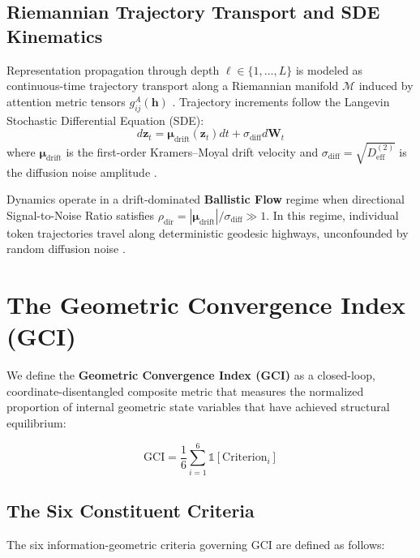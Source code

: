 \documentclass[11pt,twocolumn]{article}
\begin{document}
\subsection{Riemannian Trajectory Transport and SDE Kinematics}
Representation propagation through depth $\ell \in \{1, \dots, L\}$ is modeled as continuous-time trajectory transport along a Riemannian manifold $\mathcal{M}$ induced by attention metric tensors $g_{ij}^A(\mathbf{h})$ \cite{amari2016information, nielsen2020riemannian}. Trajectory increments follow the Langevin Stochastic Differential Equation (SDE):
\begin{equation}
d\mathbf{z}_t = \boldsymbol{\mu}_{\text{drift}}(\mathbf{z}_t) dt + \sigma_{\text{diff}} d\mathbf{W}_t
\end{equation}
where $\boldsymbol{\mu}_{\text{drift}}$ is the first-order Kramers--Moyal drift velocity and $\sigma_{\text{diff}} = \sqrt{D^{(2)}_{\text{eff}}}$ is the diffusion noise amplitude \cite{pawula1967}.

Dynamics operate in a drift-dominated \textbf{Ballistic Flow} regime when directional Signal-to-Noise Ratio satisfies $\rho_{\text{dir}} = |\boldsymbol{\mu}_{\text{drift}}| / \sigma_{\text{diff}} \gg 1$. In this regime, individual token trajectories travel along deterministic geodesic highways, unconfounded by random diffusion noise \cite{massif}.

\section{The Geometric Convergence Index (GCI)}

We define the \textbf{Geometric Convergence Index (GCI)} as a closed-loop, coordinate-disentangled composite metric that measures the normalized proportion of internal geometric state variables that have achieved structural equilibrium:

\begin{equation}
\text{GCI} = \frac{1}{6} \sum_{i=1}^{6} \mathbb{1}[\text{Criterion}_i]
\end{equation}

\subsection{The Six Constituent Criteria}
The six information-geometric criteria governing GCI are defined as follows:
\end{document}
